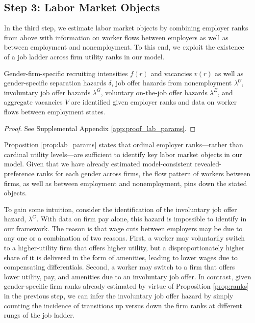 \subsection{Step 3: Labor Market Objects\label{subsec:identification_lab_params}}

In the third step, we estimate labor market objects by combining employer ranks from above with information on worker flows between employers as well as between employment and nonemployment. To this end, we exploit the existence of a job ladder across firm utility ranks in our model.
%
\newcommand{\PropLaborMarketObjects}{%
    Gender-firm-specific recruiting intensities $f(r)$ and vacancies $v(r)$ as well as gender-specific separation hazards $\delta$, job offer hazards from nonemployment $\lambda^{U}$, involuntary job offer hazards $\lambda^{G}$, voluntary on-the-job offer hazards $\lambda^{E}$, and aggregate vacancies $V$ are identified given employer ranks and data on worker flows between employment states.%
}
%
\begin{proposition}
    \label{prop:lab_params}
    \PropLaborMarketObjects
\end{proposition}
%
\begin{proof}
    See Supplemental Appendix \ref{app:proof_lab_params}.
\end{proof}

Proposition \ref{prop:lab_params} states that ordinal employer ranks---rather than cardinal utility levels---are sufficient to identify key labor market objects in our model. Given that we have already estimated model-consistent revealed-preference ranks for each gender across firms, the flow pattern of workers between firms, as well as between employment and nonemployment, pins down the stated objects.

To gain some intuition, consider the identification of the involuntary job offer hazard, $\lambda^{G}$. With data on firm pay alone, this hazard is impossible to identify in our framework. The reason is that wage cuts between employers may be due to any one or a combination of two reasons. First, a worker may voluntarily switch to a higher-utility firm that offers higher utility, but a disproportionately higher share of it is delivered in the form of amenities, leading to lower wages due to compensating differentials. Second, a worker may switch to a firm that offers lower utility, pay, and amenities due to an involuntary job offer. In contrast, given gender-specific firm ranks already estimated by virtue of Proposition \ref{prop:ranks} in the previous step, we can infer the involuntary job offer hazard by simply counting the incidence of transitions up versus down the firm ranks at different rungs of the job ladder.

